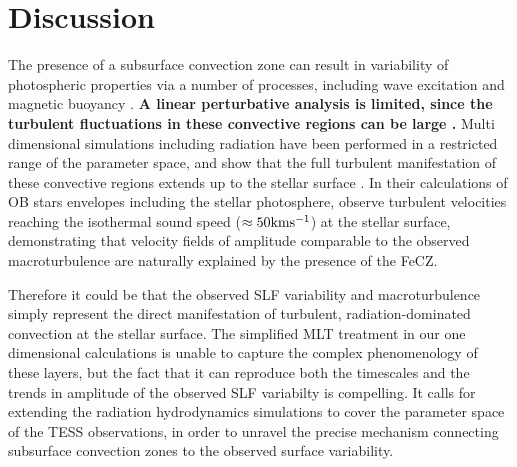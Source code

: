 \documentclass[twocolumn]{aastex63}
\begin{document}
\section{Discussion}\label{sec:discussion}
The presence of a subsurface convection zone can result in variability of photospheric properties via a number of processes, including wave excitation \citep{Cantiello:2009,Grassitelli:2015} and magnetic buoyancy \citep{Cantiello:2011}. 
{\bf A linear perturbative analysis is limited, since the turbulent fluctuations in these convective regions can be large \citep{Grassitelli:2015}. }
Multi dimensional simulations including radiation have been performed in a restricted range of the parameter space, and show that the full turbulent manifestation of these convective regions extends up to the stellar surface \citep{2015ApJ...813...74J,Jiang:2017,2018Natur.561..498J}.
In their calculations of OB stars envelopes including the stellar photosphere,  \citet{2015ApJ...813...74J}  observe turbulent velocities reaching the isothermal sound speed ($\approx 50 \rm km s^{-1}$) at the stellar surface, demonstrating that velocity fields of amplitude comparable to the observed macroturbulence are naturally explained by the presence of the FeCZ. 

 Therefore it could be that the observed SLF variability and macroturbulence simply represent the direct manifestation of turbulent, radiation-dominated convection at the stellar surface.  
The simplified MLT treatment in our one dimensional calculations is unable to capture the complex phenomenology of these layers, but the fact that it can reproduce both the  timescales and the trends in amplitude of the observed SLF variabilty is compelling. It calls for extending the radiation hydrodynamics simulations to cover the parameter space of the TESS observations, in order to unravel the precise mechanism connecting subsurface convection zones to the observed surface variability. 
\end{document}
